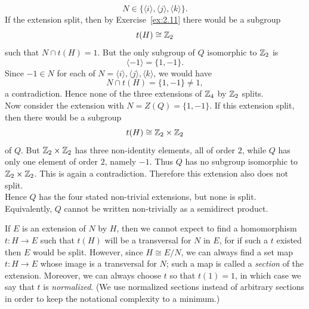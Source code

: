 \documentclass[../Odyssey_Project.tex]{subfiles}
\begin{document}
\begin{solution}
    \[
        N \in \{\langle i\rangle,\langle j\rangle,\langle k\rangle\}.
    \]
    If the extension split, then by Exercise~\ref{ex:2.11} there would be a subgroup
    \[
        t(H) \cong \mathbb{Z}_2
    \]
    such that $N \cap t(H) = 1$. But the only subgroup of $Q$ isomorphic to $\mathbb{Z}_2$ is
    \[
        \langle -1\rangle = \{1,-1\}.
    \]
    Since $-1 \in N$ for each of $N = \langle i\rangle,\langle j\rangle,\langle k\rangle$, we would have
    \[
        N \cap t(H) = \{1,-1\} \neq 1,
    \]
    a contradiction. Hence none of the three extensions of $\mathbb{Z}_4$ by $\mathbb{Z}_2$ splits. \\
    Now consider the extension with $N = Z(Q) = \{1,-1\}$. If this extension split, then there would be a subgroup
    \[
        t(H) \cong \mathbb{Z}_2 \times \mathbb{Z}_2
    \]
    of $Q$. But $\mathbb{Z}_2 \times \mathbb{Z}_2$ has three non-identity elements, all of order $2$, while $Q$ has only one element of order $2$, namely $-1$. Thus $Q$ has no subgroup isomorphic to $\mathbb{Z}_2 \times \mathbb{Z}_2$. This is again a contradiction. Therefore this extension also does not split. \\
    Hence $Q$ has the four stated non-trivial extensions, but none is split. Equivalently, $Q$ cannot be written non-trivially as a semidirect product.
\end{solution}

\noindent If $E$ is an extension of $N$ by $H$, then we cannot expect to find a homomorphism $t : H \to E$ such that $t(H)$ will be a transversal for $N$ in $E$, for if such a $t$ existed then $E$ would be split. However, since $H \cong E/N$, we can always find a set map $t : H \to E$ whose image is a transversal for $N$; such a map is called a \emph{section} of the extension. Moreover, we can always choose $t$ so that $t(1) = 1$, in which case we say that $t$ is \emph{normalized}. (We use normalized sections instead of arbitrary sections in order to keep the notational complexity to a minimum.)
\end{document}
